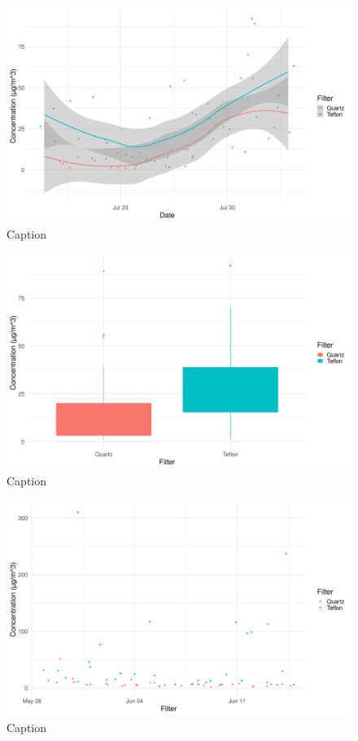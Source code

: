 \documentclass{nwureport}
\begin{document}
\begin{figure}[!htb]
    \centering
    \includegraphics[width=\textwidth]{images/pm10_winter_jittersmooth.png}
    \caption{Caption}
    \label{fig:pm10_winter_jitter_smooth}
\end{figure}

\begin{figure}[!htb]
    \centering
    \includegraphics[width=\textwidth]{images/pm10_winter_box_filter.png}
    \caption{Caption}
    \label{fig:pm10_winter_box}
\end{figure}


\begin{figure}[!htb]
    \centering
    \includegraphics[width=\textwidth]{images/pm25_autumn_jitter.png}
    \caption{Caption}
    \label{fig:pm2.5_autumn_jitter}
\end{figure}
\end{document}
